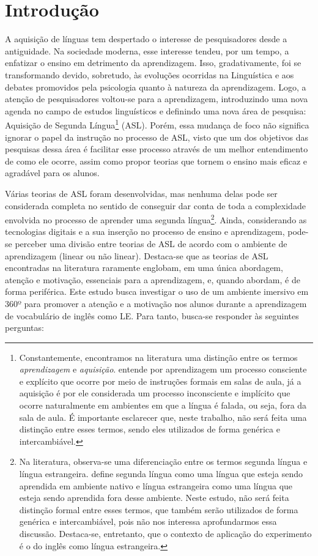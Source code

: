 \section{Introdução}\label{sec-intro}

A aquisição de línguas tem despertado o interesse de pesquisadores desde
a antiguidade. Na sociedade moderna, esse interesse tendeu, por um
tempo, a enfatizar o ensino em detrimento da aprendizagem. Isso,
gradativamente, foi se transformando devido, sobretudo, às evoluções
ocorridas na Linguística e aos debates promovidos pela psicologia quanto
à natureza da aprendizagem. Logo, a atenção de pesquisadores voltou-se
para a aprendizagem, introduzindo uma nova agenda no campo de estudos
linguísticos e definindo uma nova área de pesquisa: Aquisição de Segunda
Língua\footnote{Constantemente, encontramos na literatura uma distinção
entre os termos \emph{aprendizagem} e \emph{aquisição}. \textcite{krashen1985}
entende por aprendizagem um processo consciente e explícito que ocorre
por meio de instruções formais em salas de aula, já a aquisição é por
ele considerada um processo inconsciente e implícito que ocorre
naturalmente em ambientes em que a língua é falada, ou seja, fora da
sala de aula. É importante esclarecer que, neste trabalho, não será
feita uma distinção entre esses termos, sendo eles utilizados de forma
genérica e intercambiável.} (ASL). Porém, essa mudança de foco não
significa ignorar o papel da instrução no processo de ASL, visto que um
dos objetivos das pesquisas dessa área é facilitar esse processo através
de um melhor entendimento de como ele ocorre, assim como propor teorias
que tornem o ensino mais eficaz e agradável para os alunos.

Várias teorias de ASL foram desenvolvidas, mas nenhuma delas pode ser
considerada completa no sentido de conseguir dar conta de toda a
complexidade envolvida no processo de aprender uma segunda
língua\footnote{Na literatura, observa-se uma diferenciação entre os
termos segunda língua e língua estrangeira. \textcite{krashen1985} define
segunda língua como uma língua que esteja sendo aprendida em ambiente
nativo e língua estrangeira como uma língua que esteja sendo aprendida
fora desse ambiente. Neste estudo, não será feita distinção formal
entre esses termos, que também serão utilizados de forma genérica e
intercambiável, pois não nos interessa aprofundarmos essa discussão.
Destaca-se, entretanto, que o contexto de aplicação do experimento é o
do inglês como língua estrangeira.}. Ainda, considerando as
tecnologias digitais e a sua inserção no processo de ensino e
aprendizagem, pode-se perceber uma divisão entre teorias de ASL de
acordo com o ambiente de aprendizagem (linear ou não linear). Destaca-se
que as teorias de ASL encontradas na literatura raramente englobam, em
uma única abordagem, atenção e motivação, essenciais para a
aprendizagem, e, quando abordam, é de forma periférica. Este estudo
busca investigar o uso de um ambiente imersivo em 360º para promover a
atenção e a motivação nos alunos durante a aprendizagem de vocabulário
de inglês como LE. Para tanto, busca-se responder às seguintes
perguntas:

